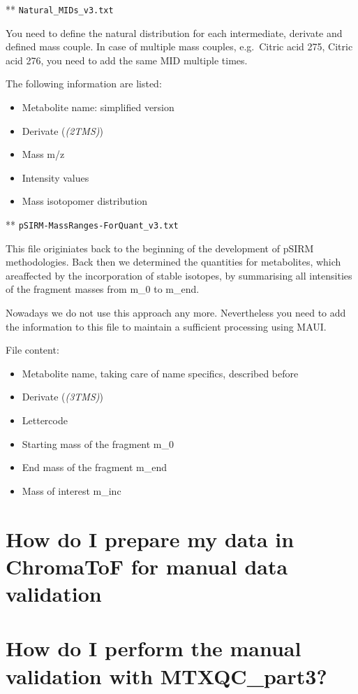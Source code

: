 \documentclass[]{book}
\providecommand{\tightlist}{%
  \setlength{\itemsep}{0pt}\setlength{\parskip}{0pt}}
\begin{document}
** \texttt{Natural\_MIDs\_v3.txt}

You need to define the natural distribution for each intermediate, derivate and defined mass couple. In case of multiple mass couples, e.g.~Citric acid 275, Citric acid 276, you need to add the same MID multiple times.

The following information are listed:

\begin{itemize}
\tightlist
\item
  Metabolite name: simplified version
\item
  Derivate (\emph{(2TMS)})
\item
  Mass m/z
\item
  Intensity values
\item
  Mass isotopomer distribution
\end{itemize}

** \texttt{pSIRM-MassRanges-ForQuant\_v3.txt}

This file originiates back to the beginning of the development of pSIRM methodologies. Back then we determined the quantities for metabolites, which areaffected by the incorporation of stable isotopes, by summarising all intensities of the fragment masses from m\_0 to m\_end.

Nowadays we do not use this approach any more. Nevertheless you need to add the information to this file to maintain a sufficient processing using MAUI.

File content:

\begin{itemize}
\tightlist
\item
  Metabolite name, taking care of name specifics, described before
\item
  Derivate (\emph{(3TMS)})
\item
  Lettercode
\item
  Starting mass of the fragment m\_0
\item
  End mass of the fragment m\_end
\item
  Mass of interest m\_inc
\end{itemize}

\hypertarget{howmanval-chroma}{%
\section{How do I prepare my data in ChromaToF for manual data validation}\label{howmanval-chroma}}

\hypertarget{howmanval-part3}{%
\section{How do I perform the manual validation with MTXQC\_part3?}\label{howmanval-part3}}
\end{document}
